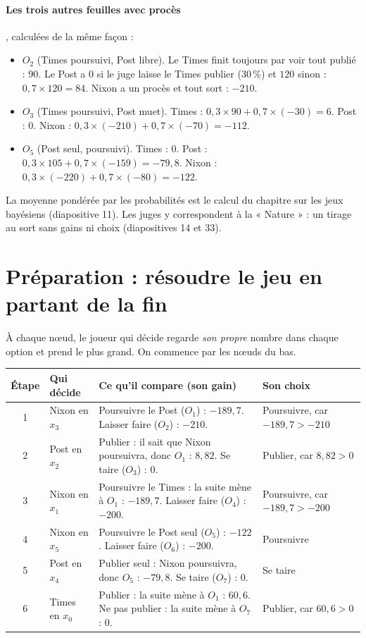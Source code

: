 \documentclass[11pt,a4paper]{article}
\theoremstyle{definition}
\begin{document}
\paragraph{Les trois autres feuilles avec procès}, calculées de la même façon :
\begin{itemize}[leftmargin=*,itemsep=3pt]
\item $O_2$ (Times poursuivi, Post libre). Le Times finit toujours par voir tout publié : $90$. Le Post a $0$ si le juge laisse le Times publier ($30\,\%$) et $120$ sinon : $0,7\times120=84$. Nixon a un procès et tout sort : $-210$.
\item $O_3$ (Times poursuivi, Post muet). Times : $0,3\times90+0,7\times(-30)=6$. Post : $0$. Nixon : $0,3\times(-210)+0,7\times(-70)=-112$.
\item $O_5$ (Post seul, poursuivi). Times : $0$. Post : $0,3\times105+0,7\times(-159)=-79,8$. Nixon : $0,3\times(-220)+0,7\times(-80)=-122$.
\end{itemize}

\begin{cours}
La moyenne pondérée par les probabilités est le calcul du chapitre sur les jeux bayésiens (diapositive 11). Les juges y correspondent à la « Nature » : un tirage au sort sans gains ni choix (diapositives 14 et 33).
\end{cours}

\section{Préparation : résoudre le jeu en partant de la fin}

À chaque nœud, le joueur qui décide regarde \emph{son propre} nombre dans chaque option et prend le plus grand. On commence par les nœuds du bas.

\begin{center}
\small
\begin{tabularx}{\textwidth}{@{}clX>{\raggedright\arraybackslash}p{3.3cm}@{}}
\toprule
Étape & Qui décide & Ce qu'il compare (son gain) & Son choix \\
\midrule
1 & Nixon en $x_3$ & Poursuivre le Post ($O_1$) : $-189,7$. Laisser faire ($O_2$) : $-210$. & Poursuivre, car $-189,7>-210$ \\
2 & Post en $x_2$ & Publier : il sait que Nixon poursuivra, donc $O_1$ : $8,82$. Se taire ($O_3$) : $0$. & Publier, car $8,82>0$ \\
3 & Nixon en $x_1$ & Poursuivre le Times : la suite mène à $O_1$ : $-189,7$. Laisser faire ($O_4$) : $-200$. & Poursuivre, car $-189,7>-200$ \\
4 & Nixon en $x_5$ & Poursuivre le Post seul ($O_5$) : $-122$. Laisser faire ($O_6$) : $-200$. & Poursuivre \\
5 & Post en $x_4$ & Publier seul : Nixon poursuivra, donc $O_5$ : $-79,8$. Se taire ($O_7$) : $0$. & Se taire \\
6 & Times en $x_0$ & Publier : la suite mène à $O_1$ : $60,6$. Ne pas publier : la suite mène à $O_7$ : $0$. & Publier, car $60,6>0$ \\
\bottomrule
\end{tabularx}
\end{center}
\end{document}
